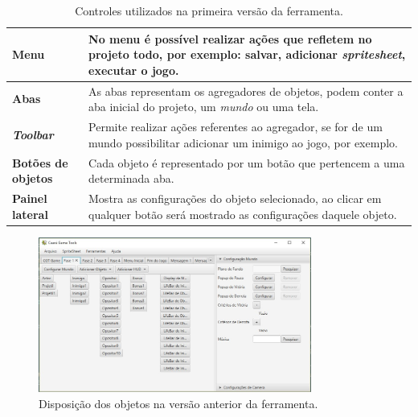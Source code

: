 \documentclass[12pt,oneside,openright,a4paper,english,brazil,sumario=tradicional]{abntex2}
\begin{document}
\begin{table}[h]
   \centering
   \begin{tabular}{| l | p{8cm} |}
      \hline
      \textbf{Menu} & No menu é possível realizar ações que refletem no projeto todo, por exemplo: salvar, adicionar \emph{spritesheet}, executar o jogo. \\
      \hline
      \textbf{Abas} & As abas representam os agregadores de objetos, podem conter a aba inicial do projeto, um \emph{mundo} ou uma tela. \\
      \hline
      \textbf{\emph{Toolbar}} & Permite realizar ações referentes ao agregador, se for de um mundo possibilitar adicionar um inimigo ao jogo, por exemplo. \\
      \hline
      \textbf{Botões de objetos} & Cada objeto é representado por um botão que pertencem a uma determinada aba. \\
      \hline
      \textbf{Painel lateral} & Mostra as configurações do objeto selecionado, ao clicar em qualquer botão será mostrado as configurações daquele objeto.  \\
      \hline
   \end{tabular}
   \caption{Controles utilizados na primeira versão da ferramenta.}
   \label{table:ferramenta_areas}
\end{table}

\begin{figure}[h]
\centering
\includegraphics[width=0.8\textwidth]{images/objetos_disposicao.jpg}
\caption{Disposição dos objetos na versão anterior da ferramenta.}
\label{fig:objetos_disp}
\end{figure}
\end{document}
